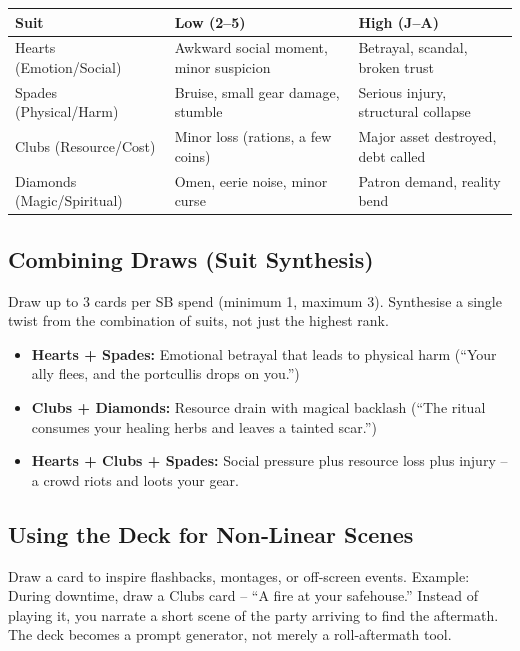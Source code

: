 \begin{center}
\small
\begin{tabular}{lll}
\toprule
\textbf{Suit} & \textbf{Low (2–5)} & \textbf{High (J–A)} \\
\midrule
Hearts (Emotion/Social) & Awkward social moment, minor suspicion & Betrayal, scandal, broken trust \\
Spades (Physical/Harm) & Bruise, small gear damage, stumble & Serious injury, structural collapse \\
Clubs (Resource/Cost) & Minor loss (rations, a few coins) & Major asset destroyed, debt called \\
Diamonds (Magic/Spiritual) & Omen, eerie noise, minor curse & Patron demand, reality bend \\
\bottomrule
\end{tabular}
\end{center}

\subsection*{Combining Draws (Suit Synthesis)}
Draw up to 3 cards per SB spend (minimum 1, maximum 3). Synthesise a single twist from the combination of suits, not just the highest rank.

\begin{itemize}
  \item \textbf{Hearts + Spades:} Emotional betrayal that leads to physical harm (“Your ally flees, and the portcullis drops on you.”)
  \item \textbf{Clubs + Diamonds:} Resource drain with magical backlash (“The ritual consumes your healing herbs and leaves a tainted scar.”)
  \item \textbf{Hearts + Clubs + Spades:} Social pressure plus resource loss plus injury – a crowd riots and loots your gear.
\end{itemize}

\subsection*{Using the Deck for Non‑Linear Scenes}
Draw a card to inspire flashbacks, montages, or off‑screen events. Example: During downtime, draw a Clubs card – “A fire at your safehouse.” Instead of playing it, you narrate a short scene of the party arriving to find the aftermath. The deck becomes a prompt generator, not merely a roll‑aftermath tool.

